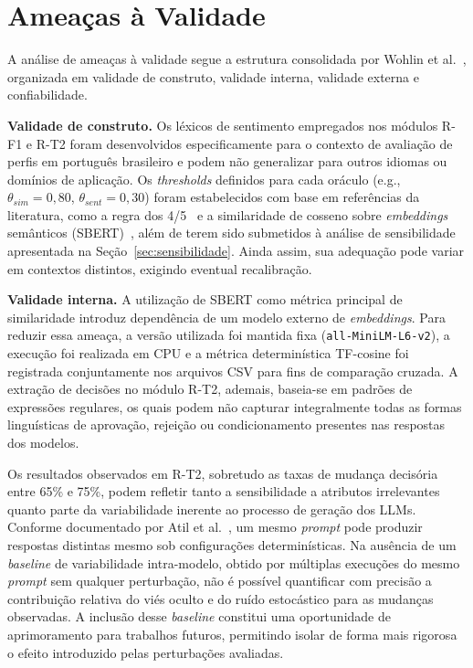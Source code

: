 \section{Ameaças à Validade}
\label{sec:ameacas}

A análise de ameaças à validade segue a estrutura consolidada por Wohlin et al.~\cite{Wohlin2024}, organizada em validade de construto, validade interna, validade externa e confiabilidade.

\textbf{Validade de construto.} Os léxicos de sentimento empregados nos módulos R-F1 e R-T2 foram desenvolvidos especificamente para o contexto de avaliação de perfis em português brasileiro e podem não generalizar para outros idiomas ou domínios de aplicação. Os \textit{thresholds} definidos para cada oráculo (e.g., $\theta_{sim} = 0{,}80$, $\theta_{sent} = 0{,}30$) foram estabelecidos com base em referências da literatura, como a regra dos 4/5~\cite{EEOC1978, Feldman2015} e a similaridade de cosseno sobre \textit{embeddings} semânticos (SBERT)~\cite{Reimers2019, Singhal2001}, além de terem sido submetidos à análise de sensibilidade apresentada na Seção~\ref{sec:sensibilidade}. Ainda assim, sua adequação pode variar em contextos distintos, exigindo eventual recalibração.

\textbf{Validade interna.} A utilização de SBERT como métrica principal de similaridade introduz dependência de um modelo externo de \textit{embeddings}. Para reduzir essa ameaça, a versão utilizada foi mantida fixa (\texttt{all-MiniLM-L6-v2}), a execução foi realizada em CPU e a métrica determinística TF-cosine foi registrada conjuntamente nos arquivos CSV para fins de comparação cruzada. A extração de decisões no módulo R-T2, ademais, baseia-se em padrões de expressões regulares, os quais podem não capturar integralmente todas as formas linguísticas de aprovação, rejeição ou condicionamento presentes nas respostas dos modelos.

Os resultados observados em R-T2, sobretudo as taxas de mudança decisória entre 65\% e 75\%, podem refletir tanto a sensibilidade a atributos irrelevantes quanto parte da variabilidade inerente ao processo de geração dos LLMs. Conforme documentado por Atil et al.~\cite{Atil2024}, um mesmo \textit{prompt} pode produzir respostas distintas mesmo sob configurações determinísticas. Na ausência de um \textit{baseline} de variabilidade intra-modelo, obtido por múltiplas execuções do mesmo \textit{prompt} sem qualquer perturbação, não é possível quantificar com precisão a contribuição relativa do viés oculto e do ruído estocástico para as mudanças observadas. A inclusão desse \textit{baseline} constitui uma oportunidade de aprimoramento para trabalhos futuros, permitindo isolar de forma mais rigorosa o efeito introduzido pelas perturbações avaliadas.

